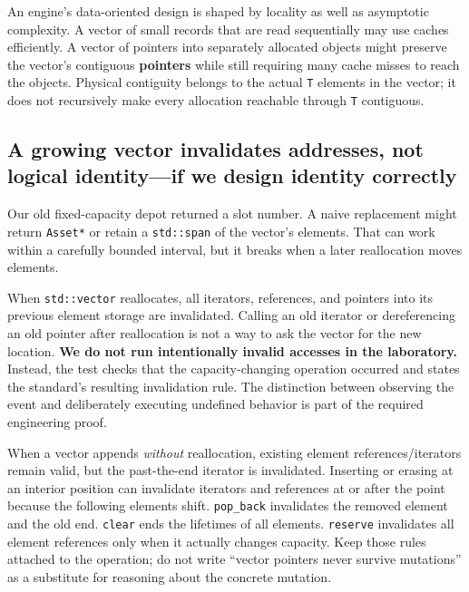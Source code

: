 An engine's data-oriented design is shaped by locality as well as asymptotic complexity. A vector of small records that are read sequentially may use caches efficiently. A vector of pointers into separately allocated objects might preserve the vector's contiguous \textbf{pointers} while still requiring many cache misses to reach the objects. Physical contiguity belongs to the actual \texttt{T} elements in the vector; it does not recursively make every allocation reachable through \texttt{T} contiguous.

\subsection{A growing vector invalidates addresses, not logical identity---if we design identity correctly}\label{01-foundations-i-ch006-a-growing-vector-invalidates-addresses-not-logical-identityif-we-design-identity-correctly}

Our old fixed-capacity depot returned a slot number. A naive replacement might return \texttt{Asset*} or retain a \texttt{std::span} of the vector's elements. That can work within a carefully bounded interval, but it breaks when a later reallocation moves elements.

When \texttt{std::vector} reallocates, all iterators, references, and pointers into its previous element storage are invalidated. Calling an old iterator or dereferencing an old pointer after reallocation is not a way to ask the vector for the new location. \textbf{We do not run intentionally invalid accesses in the laboratory.} Instead, the test checks that the capacity-changing operation occurred and states the standard's resulting invalidation rule. The distinction between observing the event and deliberately executing undefined behavior is part of the required engineering proof.

When a vector appends \emph{without} reallocation, existing element references/iterators remain valid, but the past-the-end iterator is invalidated. Inserting or erasing at an interior position can invalidate iterators and references at or after the point because the following elements shift. \texttt{pop\_back} invalidates the removed element and the old end. \texttt{clear} ends the lifetimes of all elements. \texttt{reserve} invalidates all element references only when it actually changes capacity. Keep those rules attached to the operation; do not write ``vector pointers never survive mutations'' as a substitute for reasoning about the concrete mutation.

